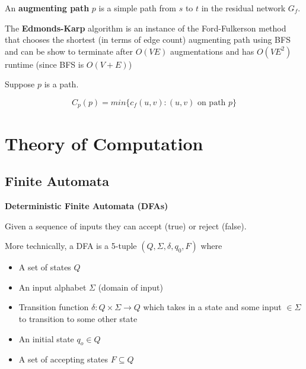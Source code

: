 \documentclass[../notes.tex]{subfiles}
\begin{document}
\begin{definition}
	An \textbf{ augmenting path} $ p $ is a simple path from $ s $ to $ t $ in the residual network $ G_f $.

\end{definition}





\begin{definition}
	The \textbf{Edmonds-Karp} algorithm is an instance of the Ford-Fulkerson method that chooses the shortest (in terms of edge count) augmenting path using BFS and can be show to terminate after $ O(VE) $ augmentations and has $ O(VE^2) $ runtime (since BFS is $ O(V+E) $)

	Suppose $ p $ is a path.

	\begin{equation}
		C_p(p) = min \{ c_f(u,v) : (u,v) \text{ on path } p \} 
		\end{equation}

\end{definition}

\section{Theory of Computation}

\subsection{Finite Automata}

\begin{definition}
	\textbf{Deterministic Finite Automata (DFAs)}

	Given a sequence of inputs they can accept (true) or reject (false).

	More technically, a DFA is a 5-tuple $ (Q, \Sigma, \delta, q_0, F) $ where



		\begin{itemize}
			\item A set of states $ Q $
			\item An input alphabet $ \Sigma $ (domain of input)
			\item Transition function $ \delta : Q \times \Sigma \to Q $ which takes in a state and some input $ \in \Sigma $ to transition to some other state
			\item An initial state $ q_o \in Q $
			\item A set of accepting states $ F \subseteq Q $
		\end{itemize}

\end{definition}
\end{document}
